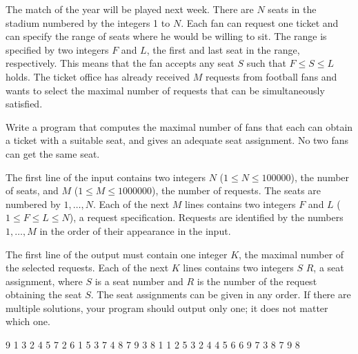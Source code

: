 





The match of the year will be played next week. There are $N$ seats in the stadium numbered by the integers 1 to $N$. Each fan can request one ticket and can specify the range of seats where he would be willing to sit. The range is specified by two integers $F$ and $L$, the first and last seat in the range, respectively. This means that the fan accepts any seat $S$ such that $F \leq S \leq L$ holds. The ticket office has already received $M$ requests from football fans and wants to select the maximal number of requests that can be simultaneously satisfied.

Write a program that computes the maximal number of fans that each can obtain a ticket with a suitable seat, and gives an adequate seat assignment. No two fans can get the same seat.

The first line of the input contains two integers $N$ ($1 \leq N \leq 100000$), the number of seats, and $M$ ($1 \leq M \leq 1000000$), the number of requests. The seats are numbered by $1,\ldots,N$. Each of the next $M$ lines contains two integers $F$ and $L$ ($1 \leq F \leq L \leq N$), a request specification. Requests are identified by the numbers $1,\ldots,M$ in the order of their appearance in the input.

The first line of the output must contain one integer $K$, the maximal number of the selected requests. Each of the next $K$ lines contains two integers $S$ $R$, a seat assignment, where $S$ is a seat number and $R$ is the number of the request obtaining the seat $S$. The seat assignments can be given in any order. If there are multiple solutions, your program should output only one; it does not matter which one.

 9
1 3
2 4
5 7
2 6
1 5
3 7
4 8
7 9
3 8
1 1
2 5
3 2
4 4
5 6
6 9
7 3
8 7
9 8
\sampleCOMMENT

\sampleEND
\bigskip


